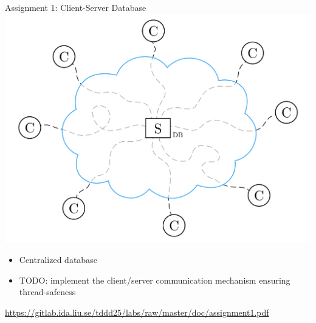 \documentclass[compress,xcolor=table]{beamer}
\begin{document}
\begin{frame}{Assignment 1: Client-Server Database}
  \centering
  \includegraphics[scale=0.10,page=1]{include/assets/single-server}
  \begin{itemize}
    \item Centralized database
    \item \alert{TODO}: implement the client/server communication mechanism ensuring thread-safeness
  \end{itemize}
  \begin{center}
    \scriptsize \url{https://gitlab.ida.liu.se/tddd25/labs/raw/master/doc/assignment1.pdf}
  \end{center}
\end{frame}
\end{document}
